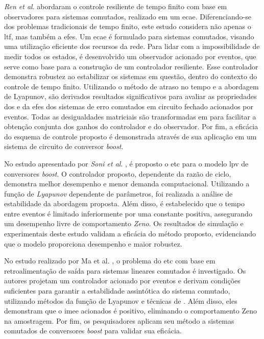 \textit{Ren et al}. \cite{Ren2018} abordaram o controle resiliente de tempo finito com base em observadores para sistemas comutados, realizado em um \acrfull{ecae}. Diferenciando-se dos problemas tradicionais de tempo finito, este estudo considera não apenas o \acrfull{ltf}, mas também a \acrfull{efes}. Um \acrshort{ecae} é formulado para sistemas comutados, visando uma utilização eficiente dos recursos da rede. Para lidar com a impossibilidade de medir todos os estados, é desenvolvido um observador acionado por eventos, que serve como base para a construção de um controlador resiliente. Esse controlador demonstra robustez ao estabilizar os sistemas em questão, dentro do contexto do controle de tempo finito. Utilizando o método de atraso no tempo e a abordagem de Lyapunov, são derivados resultados significativos para avaliar as propriedades dos  e da \acrshort{efes} dos sistemas de erro comutados em circuito fechado acionados por eventos. Todas as desigualdades matriciais são transformadas em  para facilitar a obtenção conjunta dos ganhos do controlador e do observador. Por fim, a eficácia do esquema de controle proposto é demonstrada através de sua aplicação em um sistema de circuito de conversor \textit{boost}.

No estudo apresentado por \textit{Soni et al}. \cite{Soni2023}, é proposto o \acrshort{etc} para o modelo \acrshort{lpv} de conversores \textit{boost}. O controlador proposto, dependente da razão de ciclo, demonstra melhor desempenho e menor demanda computacional. Utilizando a função de \textit{Lyapunov } dependente de parâmetros, foi realizada a análise de estabilidade da abordagem proposta. Além disso, é estabelecido que o tempo entre eventos é limitado inferiormente por uma constante positiva, assegurando um desempenho livre de comportamento \textit{Zeno}. Os resultados de simulação e experimentais deste estudo validam a eficácia do método proposto, evidenciando que o modelo proporciona desempenho e maior robustez.

No estudo realizado por Ma et al. \cite{Ma2016}, o problema do \acrshort{etc} com base em retroalimentação de saída para sistemas lineares comutados é investigado. Os autores projetam um controlador acionado por eventos e derivam condições suficientes para garantir a estabilidade assintótica do sistema comutado, utilizando métodos da função de Lyapunov e técnicas de . Além disso, eles demonstram que o \acrshort{imee} acionados é positivo, eliminando o comportamento Zeno na amostragem. Por fim, os pesquisadores aplicam seu método a sistemas comutados de conversores \textit{boost} para validar sua eficácia.

